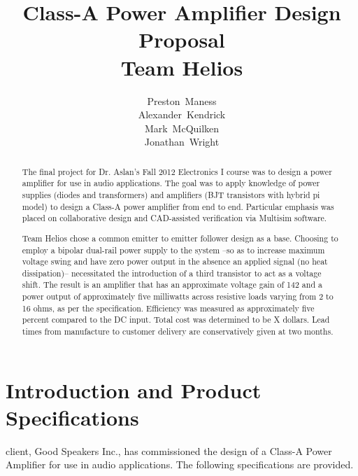 \documentclass[journal]{IEEEtran}
\begin{document}
\title{Class-A Power Amplifier Design Proposal\\Team Helios}
\author{Preston~Maness\\Alexander~Kendrick\\Mark~McQuilken\\Jonathan~Wright}

%
{}

\maketitle

\begin{abstract}
The final project for Dr. Aslan's Fall 2012 Electronics I course was to design a power amplifier for use in audio applications. The goal was to apply knowledge of power supplies (diodes and transformers) and amplifiers (BJT transistors with hybrid pi model) to design a Class-A power amplifier from end to end. Particular emphasis was placed on collaborative design and CAD-assisted verification via Multisim software. 

Team Helios chose a common emitter to emitter follower design as a base. Choosing to employ a bipolar dual-rail power supply to the system --so as to increase maximum voltage swing and have zero power output in the absence an applied signal (no heat dissipation)-- necessitated the introduction of a third transistor to act as a voltage shift. The result is an amplifier that has an approximate voltage gain of 142 and a power output of approximately five milliwatts across resistive loads varying from 2 to 16 ohms, as per the specification. Efficiency was measured as approximately five percent compared to the DC input. Total cost was determined to be X dollars. Lead times from manufacture to customer delivery are conservatively given at two months.
\end{abstract}

\tableofcontents

\section{Introduction and Product Specifications}
 client, Good Speakers Inc., has commissioned the design of a Class-A Power Amplifier for use in audio applications. The following specifications are provided. 
\end{document}

